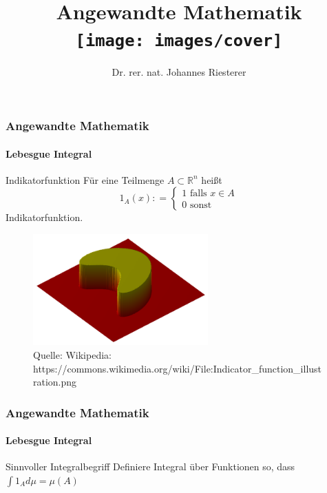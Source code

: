 \documentclass{beamer}
\begin{document}
\title[Angewandte Mathematik] %
{Angewandte Mathematik
\\
\texttt{[image: images/cover]}
}
\subtitle{}
\author[Dr. Johannes Riesterer] %
{Dr.  rer. nat. Johannes Riesterer}

\date[KPT 2004] %
{}

\subject{Angewandte Mathematik}



\frame{\titlepage}



\begin{frame}
    \frametitle{Angewandte Mathematik}
\framesubtitle{Lebesgue Integral}
    \begin{block}{Indikatorfunktion}
Für eine Teilmenge $A \subset \mathbb{R}^n$ heißt
$$ 1_A (x): = \begin{cases} 1 \text{  falls }   x \in A  \\  0  \text{  sonst}  \end{cases}$$
Indikatorfunktion.
\end{block}

\begin{figure}[H]
      \centering
    \includegraphics[width=0.6\textwidth]{images/640px-Indicator_function_illustration}
      \caption{Quelle: Wikipedia: https://commons.wikimedia.org/wiki/File:Indicator\_function\_illustration.png}

\end{figure}

 \end{frame}


\begin{frame}
    \frametitle{Angewandte Mathematik}
\framesubtitle{Lebesgue Integral}
    \begin{block}{Sinnvoller Integralbegriff}
Definiere Integral über Funktionen so, dass $\int 1_A d \mu = \mu(A)$
\end{block}

 \end{frame}
\end{document}
